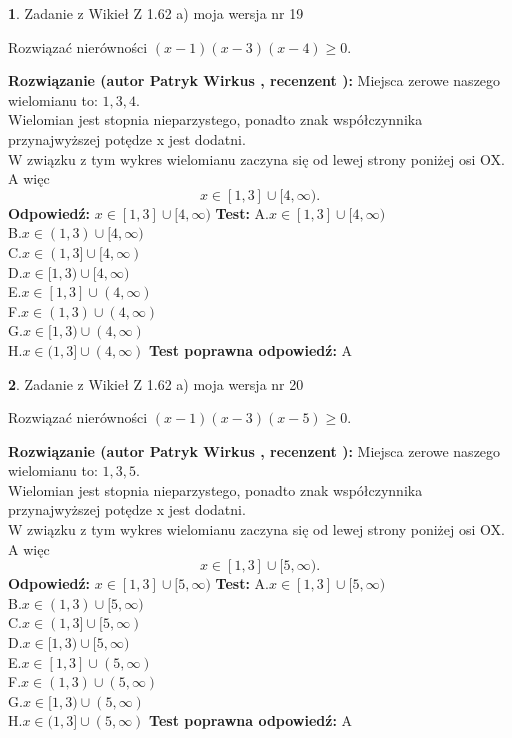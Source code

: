 \documentclass[12pt, a4paper]{article}
\theoremstyle{definition} %
\newtheorem{zad}{}
\newcommand{\zadStart}[1]{\begin{zad}#1\newline}
\newcommand{\zadStop}{\end{zad}}
\newcommand{\rozwStart}[2]{\noindent \textbf{Rozwiązanie (autor #1 , recenzent #2): }\newline}
\newcommand{\rozwStop}{\newline}
\newcommand{\odpStart}{\noindent \textbf{Odpowiedź:}\newline}
\newcommand{\odpStop}{\newline}
\newcommand{\testStart}{\noindent \textbf{Test:}\newline}
\newcommand{\testStop}{\newline}
\newcommand{\kluczStart}{\noindent \textbf{Test poprawna odpowiedź:}\newline}
\newcommand{\kluczStop}{\newline}
\begin{document}
\zadStart{Zadanie z Wikieł Z 1.62 a) moja wersja nr 19}

Rozwiązać nierówności $(x-1)(x-3)(x-4)\ge0$.
\zadStop
\rozwStart{Patryk Wirkus}{}
Miejsca zerowe naszego wielomianu to: $1, 3, 4$.\\
Wielomian jest stopnia nieparzystego, ponadto znak współczynnika przy\linebreak najwyższej potędze x jest dodatni.\\ W związku z tym wykres wielomianu zaczyna się od lewej strony poniżej osi OX. A więc $$x \in [1,3] \cup [4,\infty).$$
\rozwStop
\odpStart
$x \in [1,3] \cup [4,\infty)$
\odpStop
\testStart
A.$x \in [1,3] \cup [4,\infty)$\\
B.$x \in (1,3) \cup [4,\infty)$\\
C.$x \in (1,3] \cup [4,\infty)$\\
D.$x \in [1,3) \cup [4,\infty)$\\
E.$x \in [1,3] \cup (4,\infty)$\\
F.$x \in (1,3) \cup (4,\infty)$\\
G.$x \in [1,3) \cup (4,\infty)$\\
H.$x \in (1,3] \cup (4,\infty)$
\testStop
\kluczStart
A
\kluczStop



\zadStart{Zadanie z Wikieł Z 1.62 a) moja wersja nr 20}

Rozwiązać nierówności $(x-1)(x-3)(x-5)\ge0$.
\zadStop
\rozwStart{Patryk Wirkus}{}
Miejsca zerowe naszego wielomianu to: $1, 3, 5$.\\
Wielomian jest stopnia nieparzystego, ponadto znak współczynnika przy\linebreak najwyższej potędze x jest dodatni.\\ W związku z tym wykres wielomianu zaczyna się od lewej strony poniżej osi OX. A więc $$x \in [1,3] \cup [5,\infty).$$
\rozwStop
\odpStart
$x \in [1,3] \cup [5,\infty)$
\odpStop
\testStart
A.$x \in [1,3] \cup [5,\infty)$\\
B.$x \in (1,3) \cup [5,\infty)$\\
C.$x \in (1,3] \cup [5,\infty)$\\
D.$x \in [1,3) \cup [5,\infty)$\\
E.$x \in [1,3] \cup (5,\infty)$\\
F.$x \in (1,3) \cup (5,\infty)$\\
G.$x \in [1,3) \cup (5,\infty)$\\
H.$x \in (1,3] \cup (5,\infty)$
\testStop
\kluczStart
A
\kluczStop
\end{document}
